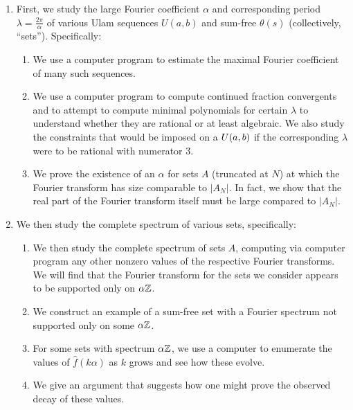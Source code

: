 \documentclass{report}
\theoremstyle{remark}
\numberwithin{equation}{section}
\begin{document}
\begin{enumerate}
\item First, we study the large Fourier coefficient $\alpha$ and
  corresponding period $\lambda = \frac{2\pi}{\alpha}$ of various Ulam
  sequences $U(a,b)$ and sum-free $\theta(s)$ (collectively,
  ``\relevant sets'').  Specifically:
  \begin{enumerate}
  \item We use a computer program to estimate the maximal Fourier
    coefficient of many such sequences.
  \item We use a computer program to compute continued fraction
    convergents and to attempt to compute minimal polynomials for
    certain $\lambda$ to understand whether they are rational or at
    least algebraic.  We also study the constraints that would be
    imposed on a $U(a,b)$ if the corresponding $\lambda$ were to
    be rational with numerator 3.
  \item We prove the existence of an $\alpha$ for \relevant sets $A$
    (truncated at $N$) at which the Fourier transform has size
    comparable to $|A_N|$.  In fact, we show that the real part of the
    Fourier transform itself must be large compared to $|A_N|$.
  \end{enumerate}

\item We then study the complete spectrum of various \relevant sets,
  specifically:
  \begin{enumerate}
  \item We then study the complete spectrum of \relevant sets $A$,
    computing via computer program any other nonzero values of the
    respective Fourier transforms.  We will find that the Fourier
    transform for the sets we consider appears to be supported only on
    $\alpha\mathbb{Z}$.
  \item We construct an example of a sum-free set with a Fourier
    spectrum not supported only on some $\alpha\mathbb{Z}$.
  \item For some \relevant sets with spectrum $\alpha\mathbb{Z}$, we use a
    computer to enumerate the values of $\widehat{f}(k\alpha)$ as $k$
    grows and see how these evolve.
  \item We give an argument that suggests how one might prove the
    observed decay of these values.
  \end{enumerate}


\end{enumerate}
\end{document}
